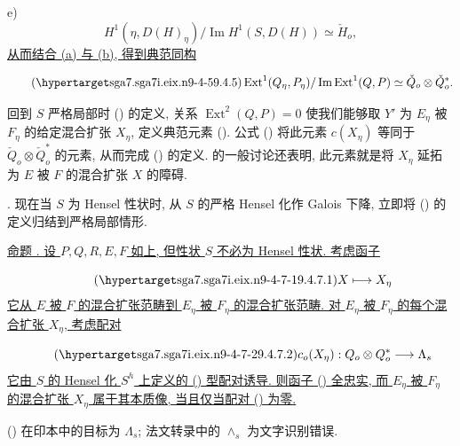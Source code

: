 \noindent
e)
\begin{equation*}
H^1(\eta,D(H)_\eta)/\operatorname{Im}H^1(S,D(H))
\simeq\check H_o,
\end{equation*}
\underline{从而结合 (a) 与 (b), 得到典范同构}

\begin{equation}\tag{\SGARefTarget{sga7.sga7i.eix.n9-4-5}{9.4.5}}
\operatorname{Ext}^1(Q_\eta,P_\eta)/
\operatorname{Im}\operatorname{Ext}^1(Q,P)
\simeq\check Q_o\otimes\check Q_o^*.
\end{equation}

回到 $S$ 严格局部时 () 的定义, 关系 $\operatorname{Ext}^2(Q,P)=0$ 使我们能够取 $Y'$ 为 $E_\eta$ 被 $F_\eta$ 的给定混合扩张 $X_\eta$, 定义典范元素 (). 公式 () 将此元素 $c(X_\eta)$ 等同于 $\check Q_o\otimes\check Q_o^*$ 的元素, 从而完成 () 的定义.  的一般讨论还表明, 此元素就是将 $X_\eta$ 延拓为 $E$ 被 $F$ 的混合扩张 $X$ 的障碍.

\medskip
\noindent
{}. 现在当 $S$ 为 Hensel 性状时, 从 $S$ 的严格 Hensel 化作 Galois 下降, 立即将 () 的定义归结到严格局部情形.

\medskip
\noindent
\underline{命题 . 设 $P,Q,R,E,F$ 如上, 但性状 $S$ 不必为 Hensel 性状. 考虑函子}

\begin{equation}\tag{\SGARefTarget{sga7.sga7i.eix.n9-4-7-1}{9.4.7.1}}
X\longmapsto X_\eta
\end{equation}
\underline{它从 $E$ 被 $F$ 的混合扩张范畴到 $E_\eta$ 被 $F_\eta$ 的混合扩张范畴. 对 $E_\eta$ 被 $F_\eta$ 的每个混合扩张 $X_\eta$, 考虑配对}

\begin{equation}\tag{\SGARefTarget{sga7.sga7i.eix.n9-4-7-2}{9.4.7.2}}
c_o(X_\eta):Q_o\otimes Q_o^*\longrightarrow\Lambda_s
\end{equation}
\underline{它由 $S$ 的 Hensel 化 $S^h$ 上定义的 () 型配对诱导. 则函子 () 全忠实, 而 $E_\eta$ 被 $F_\eta$ 的混合扩张 $X_\eta$ 属于其本质像, 当且仅当配对 () 为零.}

() 在印本中的目标为 $\Lambda_s$; 法文转录中的 $\wedge_s$ 为文字识别错误.

